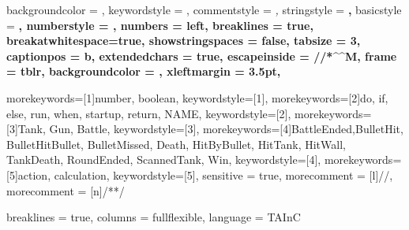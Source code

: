 
\usepackage{listings}


\usepackage{algorithm}%
\usepackage{algpseudocode}%


\captionsetup[lstlisting]{
    format = listing
}

\lstset 
{
    backgroundcolor = \color{white},
    keywordstyle = \color{blue},
    commentstyle = \color{ForestGreen!80}\textit,
    stringstyle = \color{green}\textbf,
    basicstyle = \scriptsize\ttfamily\bfseries,
    numberstyle = \tiny,
    numbers = left,
    breaklines = true,
    breakatwhitespace=true,
    showstringspaces = false,
    tabsize = 3,
    captionpos = b,
    extendedchars = true,
    escapeinside = {//*}{\^^M}, %
    frame = tblr,
    backgroundcolor = \color{gray!5},
    xleftmargin = 3.5pt,
}

\renewcommand{\lstlistingname}{Code Snippet}

\captionsetup[lstlisting]{format = listing}

{
    morekeywords=[1]{number, boolean}, 
    keywordstyle=[1]\color{NavyBlue},
    morekeywords=[2]{do, if, else, run, when, startup, return, NAME},
    keywordstyle=[2]\color{Magenta},
    morekeywords=[3]{Tank, Gun, Battle},
    keywordstyle=[3]\color{Green},
    morekeywords=[4]{BattleEnded,BulletHit, BulletHitBullet, BulletMissed, Death, HitByBullet, HitTank, HitWall, TankDeath, RoundEnded, ScannedTank, Win},
    keywordstyle=[4]\color{Bittersweet},
    morekeywords=[5]{action, calculation},
    keywordstyle=[5]\color{Fuchsia},
    sensitive = true,
    morecomment = [l]{//},
    morecomment = [n]{/*}{*/}
}

{
    breaklines = true,
    columns = fullflexible,
    language = TAInC
}

\newcommand{\taincinline}[1]{\lstinline[style = tainc, basicstyle = \ttfamily\normalsize]{#1}}


